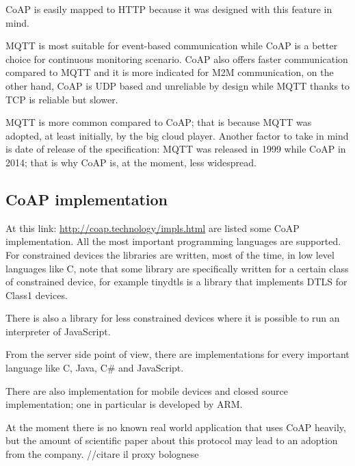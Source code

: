 	CoAP is easily mapped to HTTP because it was designed with this feature in mind.
	
	MQTT is most suitable for event-based communication while CoAP is a better choice for continuous monitoring scenario.\newline
	CoAP also offers faster communication compared to MQTT and it is more indicated for M2M communication, on the other hand, CoAP is UDP based and unreliable by design while MQTT thanks to TCP is reliable but slower.
	
	MQTT is more common compared to CoAP; that is because MQTT was adopted, at least initially, by the big cloud player.\newline
	Another factor to take in mind is date of release of the specification: MQTT was released in 1999 while CoAP in 2014; that is why CoAP is, at the moment, less widespread.
	
	\subsection{CoAP implementation}
	At this link: \url{http://coap.technology/impls.html} are listed some CoAP implementation.\newline
	All the most important programming languages are supported.\newline
	For constrained devices the libraries are written, most of the time, in low level languages like C, note that some library are specifically written for a certain class of constrained device, for example tinydtls is a library that implements DTLS for Class1 devices.\newline
	
	There is also a library for less constrained devices where it is possible to run an interpreter of JavaScript.\newline
	
	From the server side point of view, there are implementations for every important language like C, Java, C\# and JavaScript.\newline
	
	There are also implementation for mobile devices and closed source implementation; one in particular is developed by ARM.\newline
	
	At the moment there is no known real world application that uses CoAP heavily, but the amount of scientific paper about this protocol may lead to an adoption from the company.
	\newline
	//citare il proxy bolognese